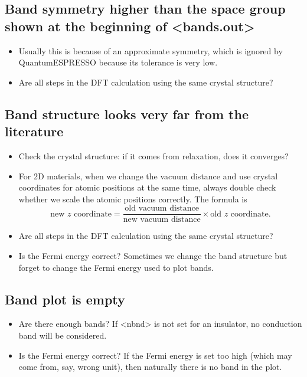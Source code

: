 \documentclass[hyperref, a4paper, 12pt]{report}
\def\texttt#1{<#1>}%
\newcommand{\shortcode}[1]{\texttt{#1}}
\begin{document}
\subsection{Band symmetry higher than the space group shown at the beginning of \shortcode{bands.out}}

\begin{itemize}
    \item Usually this is because of an approximate symmetry,
    which is ignored by QuantumESPRESSO because its tolerance is very low.
    \item Are all steps in the DFT calculation using the same crystal structure?
\end{itemize}

\subsection{Band structure looks very far from the literature}

\begin{itemize}
    \item Check the crystal structure: if it comes from relaxation,
    does it converges?
    \item For 2D materials, 
    when we change the vacuum distance
    and use crystal coordinates for atomic positions at the same time, 
    always double check whether we scale the atomic positions correctly.
    The formula is 
    \begin{equation}
        \text{new $z$ coordinate} = \frac{\text{old vacuum distance}}{\text{new vacuum distance}} \times \text{old $z$ coordinate}.
    \end{equation}
    \item Are all steps in the DFT calculation using the same crystal structure?
    \item Is the Fermi energy correct? 
    Sometimes we change the band structure but forget to change the Fermi energy used to plot bands.
\end{itemize}

\subsection{Band plot is empty}

\begin{itemize}
    \item Are there enough bands? 
    If \shortcode{nbnd} is not set for an insulator,
    no conduction band will be considered.
    \item Is the Fermi energy correct? If the Fermi energy is set too high 
    (which may come from, say, wrong unit), 
    then naturally there is no band in the plot.
\end{itemize}
\end{document}
